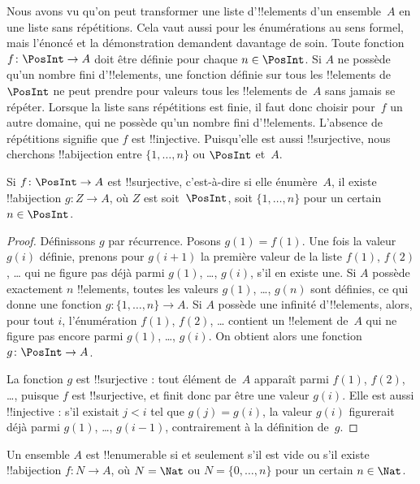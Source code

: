 \documentclass[11pt,a4paper,openany]{memoir}
\begin{document}
Nous avons vu qu’on peut transformer une liste d’!!{element}s
d’un ensemble~$A$ en une liste sans répétitions. Cela vaut aussi pour
les énumérations au sens formel, mais l’énoncé et la démonstration
demandent davantage de soin. Toute fonction $f\colon \PosInt \to A$
doit être définie pour chaque $n \in \PosInt$. Si $A$ ne possède
qu’un nombre fini d’!!{element}s, une fonction définie sur tous les
!!{element}s de $\PosInt$ ne peut prendre pour valeurs tous les
!!{element}s de~$A$ sans jamais se répéter. Lorsque la liste sans
répétitions est finie, il faut donc choisir pour~$f$ un autre domaine,
qui ne possède qu’un nombre fini d’!!{element}s. L’absence de répétitions
signifie que $f$ est !!{injective}. Puisqu’elle est aussi !!{surjective},
nous cherchons !!a{bijection} entre $\{1, \dots, n\}$ ou $\PosInt$ et~$A$.

\begin{prop}
Si $f\colon \PosInt \to A$ est !!{surjective}, c’est-à-dire si elle
énumère~$A$, il existe !!a{bijection} $g\colon Z \to A$, où $Z$ est
soit~$\PosInt$, soit $\{1, \dots, n\}$ pour un certain~$n \in \PosInt$.
\end{prop}

\begin{proof}
Définissons $g$ par récurrence. Posons $g(1) = f(1)$. Une fois la valeur
$g(i)$ définie, prenons pour $g(i+1)$ la première valeur de la liste $f(1)$,
$f(2)$, \dots{} qui ne figure pas déjà parmi $g(1)$, \dots, $g(i)$,
s’il en existe une. Si $A$ possède exactement $n$ !!{element}s,
toutes les valeurs $g(1)$, \dots, $g(n)$ sont définies, ce qui donne
une fonction $g\colon \{1, \dots, n\} \to A$. Si $A$ possède une
infinité d’!!{element}s, alors, pour tout $i$, l’énumération $f(1)$,
$f(2)$, \dots{} contient un !!{element} de~$A$ qui ne figure pas encore
parmi $g(1)$, \dots, $g(i)$. On obtient alors une fonction
$g\colon \PosInt \to A$.

La fonction $g$ est !!{surjective} : tout élément de~$A$ apparaît
parmi $f(1)$, $f(2)$, \dots{}, puisque $f$ est !!{surjective}, et finit
donc par être une valeur $g(i)$. Elle est aussi !!{injective} : s’il
existait $j < i$ tel que $g(j) = g(i)$, la valeur $g(i)$ figurerait déjà
parmi $g(1)$, \dots, $g(i-1)$, contrairement à la définition de~$g$.
\end{proof}

\begin{cor}
Un ensemble $A$ est !!{enumerable} si et seulement s’il est vide
ou s’il existe !!a{bijection} $f\colon N \to A$, où $N = \Nat$
ou $N = \{0, \dots, n\}$ pour un certain $n \in \Nat$.
\end{cor}
\end{document}

